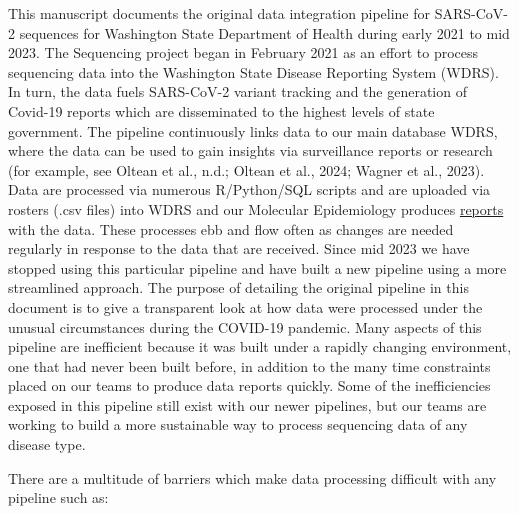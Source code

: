\documentclass[
]{agujournal2019}
\begin{document}
This manuscript documents the original data integration pipeline for
SARS-CoV-2 sequences for Washington State Department of Health during
early 2021 to mid 2023. The Sequencing project began in February 2021 as
an effort to process sequencing data into the Washington State Disease
Reporting System (WDRS). In turn, the data fuels SARS-CoV-2 variant
tracking and the generation of Covid-19 reports which are disseminated
to the highest levels of state government. The pipeline continuously
links data to our main database WDRS, where the data can be used to gain
insights via surveillance reports or research (for example, see Oltean
et al., n.d.; Oltean et al., 2024; Wagner et al., 2023). Data are
processed via numerous R/Python/SQL scripts and are uploaded via rosters
(.csv files) into WDRS and our Molecular Epidemiology produces
\href{https://doh.wa.gov/sites/default/files/2022-02/420-316-SequencingAndVariantsReport.pdf}{reports}
with the data. These processes ebb and flow often as changes are needed
regularly in response to the data that are received. Since mid 2023 we
have stopped using this particular pipeline and have built a new
pipeline using a more streamlined approach. The purpose of detailing the
original pipeline in this document is to give a transparent look at how
data were processed under the unusual circumstances during the COVID-19
pandemic. Many aspects of this pipeline are inefficient because it was
built under a rapidly changing environment, one that had never been
built before, in addition to the many time constraints placed on our
teams to produce data reports quickly. Some of the inefficiencies
exposed in this pipeline still exist with our newer pipelines, but our
teams are working to build a more sustainable way to process sequencing
data of any disease type.

There are a multitude of barriers which make data processing difficult
with any pipeline such as:
\end{document}
